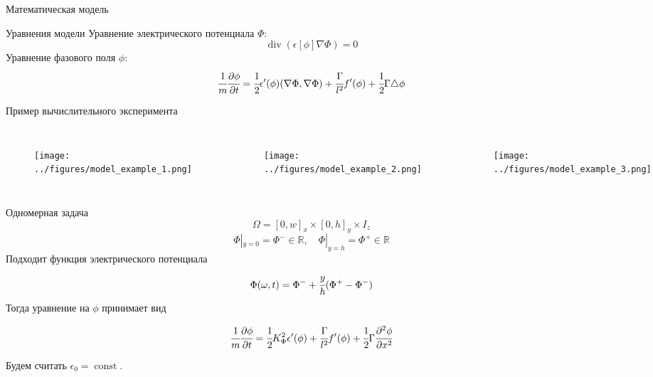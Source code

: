 \documentclass{beamer}
\DeclareMathOperator{\Div}{div}
\DeclareMathOperator{\Const}{const}
\newcommand*{\hm}[1]{#1\nobreak\discretionary{}
{\hbox{$\mathsurround=0pt #1$}}{}}
\begin{document}
\begin{frame}{Математическая модель}
\begin{block}{Уравнения модели}
	Уравнение электрического потенциала $\Phi$:
	$$\Div(\epsilon[\phi] \nabla \Phi) = 0 \label{equation_Phi}$$
	Уравнение фазового поля $\phi$:
	$$\cfrac{1}{m} \cfrac{\partial \phi}{\partial t} = \cfrac{1}{2} \epsilon'(\phi)
	(\nabla \Phi, \nabla \Phi) + \cfrac{\Gamma}{l^2} f'(\phi) +
	\cfrac{1}{2} \Gamma \triangle \phi$$
\end{block}
\end{frame}


\begin{frame}{Пример вычислительного эксперимента}
\begin{columns}
\begin{figure}
	\texttt{[image: ../figures/model\_example\_1.png]}
\end{figure}
\begin{figure}
	\texttt{[image: ../figures/model\_example\_2.png]}
\end{figure}
\begin{figure}
	\texttt{[image: ../figures/model\_example\_3.png]}
\end{figure}
\end{columns}
\end{frame}


\begin{frame}{Одномерная задача}
$$\Omega = [0, w]_x \times [0, h]_y \times I_z$$
$$\Phi|_{y = 0} = \Phi^- \in \mathbb{R}, \quad \Phi|_{y = h} = \Phi^+ \in \mathbb{R}$$
Подходит функция электрического потенциала
$$\Phi(\omega, t) = \Phi^- \hm + \cfrac{y}{h}(\Phi^+ - \Phi^-)$$
Тогда уравнение на $\phi$ принимает вид
\begin{block}{}
	$$\cfrac{1}{m} \cfrac{\partial \phi}{\partial t} = \cfrac{1}{2} K_\Phi^2 \epsilon'(\phi) +
	\cfrac{\Gamma}{l^2} f'(\phi) + \cfrac{1}{2} \Gamma \cfrac{\partial^2 \phi}{\partial x^2}$$
\end{block}
Будем считать $\epsilon_0 = \Const$.
\end{frame}
\end{document}

